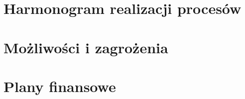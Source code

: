 \documentclass[12pt]{article}
\begin{document}

\section{Harmonogram realizacji procesów}


\section{Możliwości i zagrożenia}


\section{Plany finansowe}



\end{document}
